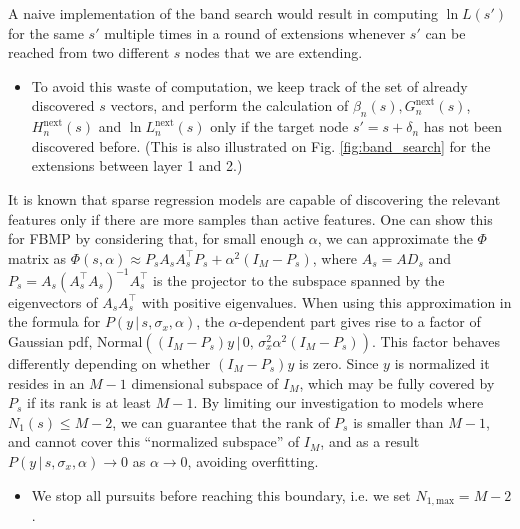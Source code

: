 \documentclass[letter,10pt,oneside]{article}
\newcommand{\+}{^\dagger}
\newcommand{\T}{^\top}
\newcommand{\reffig}[1]{Fig. \ref{#1}}
\begin{document}
A naive implementation of the band search would result in computing $\ln L(s')$ for the same $s'$ multiple times in a round of extensions whenever $s'$ can be reached from two different $s$ nodes that we are extending. 
\begin{itemize}
  \item To avoid this waste of computation, we keep track of the set of already discovered $s$ vectors, and perform the calculation of $\beta_n(s), G^\text{next}_n(s)$, $H^\text{next}_n(s)$ and $\ln L^\text{next}_n(s)$ only if the target node $s' = s + \delta_n$ has not been discovered before. (This is also illustrated on \reffig{fig:band_search} for the extensions between layer 1 and 2.)
\end{itemize}


It is known that sparse regression models are capable of discovering the relevant features only if there are more samples than active features. One can show this for FBMP by considering that, for small enough $\alpha$, we can approximate the $\Phi$ matrix as $\Phi(s, \alpha) \approx P_s A_s A_s\T P_s + \alpha^2(I_M - P_s)$, where $A_s = AD_s$ and $P_s = A_s(A_s\T A_s)^{-1} A_s\T$ is the projector to the subspace spanned by the eigenvectors of $A_sA_s\T$ with positive eigenvalues. When using this approximation in the formula for $P(y\,|\,s, \sigma_x, \alpha)$, the $\alpha$-dependent part gives rise to a factor of Gaussian pdf, $\text{Normal}((I_M - P_s)y\,|\,0,\, \sigma_x^2 \alpha^2 (I_M - P_s))$. This factor behaves differently depending on whether $(I_M - P_s)y$ is zero. Since $y$ is normalized it resides in an $M-1$ dimensional subspace of $I_M$, which may be fully covered by $P_s$ if its rank is at least $M-1$. By limiting our investigation to models where $N_1(s) \leq M - 2$, we can guarantee that the rank of $P_s$ is smaller than $M - 1$, and cannot cover this ``normalized subspace'' of $I_M$, and as a result $P(y\,|\,s, \sigma_x, \alpha)\rightarrow 0$ as $\alpha \rightarrow 0$, avoiding overfitting.
\begin{itemize}
  \item We stop all pursuits before reaching this boundary, i.e. we set $N_{1,\text{max}} = M - 2$.
\end{itemize}
\end{document}
